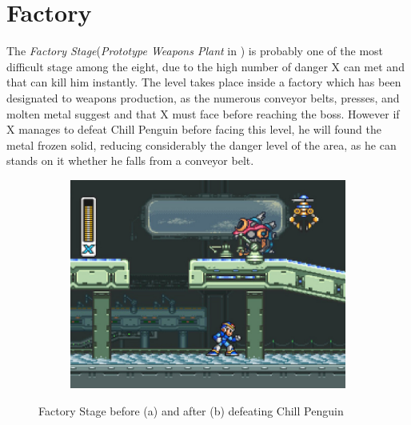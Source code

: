 \section{Factory} 
The \textit{Factory Stage}(\textit{Prototype Weapons Plant} in \mhx)  is probably one of the most difficult stage among the eight, due to the high number of danger X can met and that can kill him instantly. The level takes place inside a factory which has been designated to weapons production, as the numerous conveyor belts, presses, and molten metal suggest and that X must face before reaching the boss. However if X manages to defeat Chill Penguin before facing this level, he will found the metal frozen solid, reducing considerably the danger level of the area, as he can stands on it whether he falls from a conveyor belt.
\begin{figure}[h]
	\centering
	\begin{subfigure}{0.4\textwidth}
		\centering
		\includegraphics[width=\linewidth]{figures/X1/Flame_frozen.jpg}
		\caption{}
	\end{subfigure}
	\caption{Factory Stage before (a) and after (b)  defeating Chill Penguin}
\end{figure}

